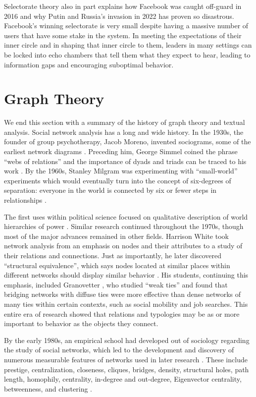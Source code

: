 \documentclass[doublespacing]{utdthesis}
\let\cite=\citep
\begin{document}
Selectorate theory also in part explains how Facebook was caught off-guard in 2016 and why Putin and Russia's invasion in 2022 has proven so disastrous.
Facebook's winning selectorate is very small despite having a massive number of users that have some stake in the system.
In meeting the expectations of their inner circle and in shaping that inner circle to them, leaders in many settings can be locked into echo chambers that tell them what they expect to hear, leading to information gaps and encouraging suboptimal behavior.

\section{Graph Theory}

We end this section with a summary of the history of graph theory and textual analysis.
Social network analysis has a long and wide history.
In the 1930s, the founder of group psychotherapy, Jacob Moreno, invented sociograms, some of the earliest network diagrams \cite{moreno1934}.
Preceding him, George Simmel coined the phrase ``webs of relations'' and the importance of dyads and triads can be traced to his work \cite[p. 249]{ward2011}. 
By the 1960s, Stanley Milgram was experimenting with ``small-world'' experiments which would eventually turn into the concept of six-degrees of separation: everyone in the world is connected by six or fewer steps in
relationships \cite{milgram1967}.

The first uses within political science focused on qualitative description of world hierarchies of power \cite{galtung2019}. 
Similar research continued throughout the 1970s, though most of the major
advances remained in other fields.
Harrison White took network analysis from an emphasis on nodes and their attributes to a study of their relations and connections. Just as importantly, he later discovered ``structural equivalence'', which says nodes located at similar places within different networks should display similar behavior \cite{lorrain1971}.
His students, continuing this emphasis, included Granovetter \citeyear{granovetter1973}, who studied ``weak ties'' and found that bridging networks with diffuse ties were more effective than dense networks of many ties within certain
contexts, such as social mobility and job searches.
This entire era of research showed that relations and typologies may be as or more important to behavior as the objects they connect.

By the early 1980s, an empirical school had developed out of sociology regarding the study of social networks, which led to the development and discovery of numerous measurable features of networks used in later research \cite[p. 249]{ward2011}. 
These include prestige, centralization, closeness, cliques, bridges, density, structural holes, path length, homophily, centrality, in-degree and out-degree, Eigenvector centrality, betweenness, and clustering \cite{burt1982, de1978, mcpherson2001, maoz2006, hammerli2006, fowler2007, kolaczyk2009, fowler2011}.
\end{document}
